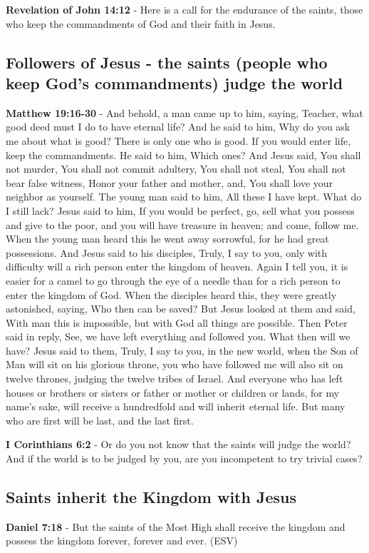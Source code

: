 \documentclass[11pt]{article}
\begin{document}
\textbf{Revelation of John 14:12} - Here is a call for the endurance of the saints, those who keep the commandments of God and their faith in Jesus.

\subsection{Followers of Jesus - the saints (people who keep God's commandments) judge the world}
\label{sec:org2100e55}
\textbf{Matthew 19:16-30} - And behold, a man came up to him, saying, Teacher, what good deed must I do to have eternal life? And he said to him, Why do you ask me about what is good? There is only one who is good. If you would enter life, keep the commandments. He said to him, Which ones? And Jesus said, You shall not murder, You shall not commit adultery, You shall not steal, You shall not bear false witness, Honor your father and mother, and, You shall love your neighbor as yourself. The young man said to him, All these I have kept. What do I still lack? Jesus said to him, If you would be perfect, go, sell what you possess and give to the poor, and you will have treasure in heaven; and come, follow me. When the young man heard this he went away sorrowful, for he had great possessions. And Jesus said to his disciples, Truly, I say to you, only with difficulty will a rich person enter the kingdom of heaven. Again I tell you, it is easier for a camel to go through the eye of a needle than for a rich person to enter the kingdom of God. When the disciples heard this, they were greatly astonished, saying, Who then can be saved? But Jesus looked at them and said, With man this is impossible, but with God all things are possible. Then Peter said in reply, See, we have left everything and followed you. What then will we have? Jesus said to them, Truly, I say to you, in the new world, when the Son of Man will sit on his glorious throne, you who have followed me will also sit on twelve thrones, judging the twelve tribes of Israel. And everyone who has left houses or brothers or sisters or father or mother or children or lands, for my name's sake, will receive a hundredfold and will inherit eternal life. But many who are first will be last, and the last first.

\textbf{I Corinthians 6:2} - Or do you not know that the saints will judge the world? And if the world is to be judged by you, are you incompetent to try trivial cases?

\subsection{Saints inherit the Kingdom with Jesus}
\label{sec:orgd296ea9}
\textbf{Daniel 7:18} - But the saints of the Most High shall receive the kingdom and possess the kingdom forever, forever and ever. (ESV)
\end{document}
